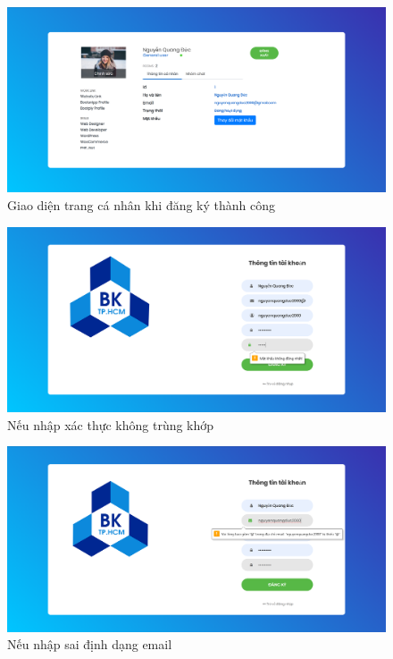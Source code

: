 \documentclass[a4paper]{article}
\begin{document}
	\begin{figure}[H]
		\centering
		\includegraphics[scale=0.36]{profile_manager.png}
		\caption{Giao diện trang cá nhân khi đăng ký thành công}
		\label{F:profile_manager_register}
	\end{figure}
	
	\begin{figure}[H]
		\centering
		\includegraphics[scale=0.36]{password_not_match_register.png}
		\caption{Nếu nhập xác thực không trùng khớp}
		\label{F:password_not_match_register}
	\end{figure}
	
	\begin{figure}[H]
		\centering
		\includegraphics[scale=0.36]{check_email.png}
		\caption{Nếu nhập sai định dạng email}
		\label{F:check_email}
	\end{figure}
	
\end{document}
